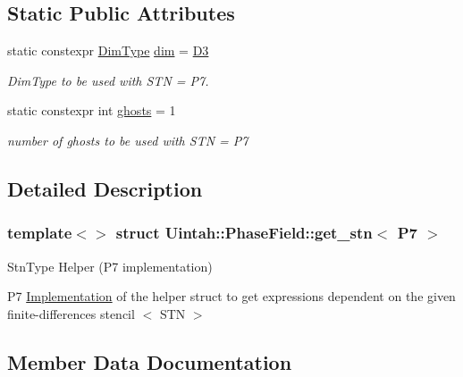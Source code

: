 \subsection*{Static Public Attributes}
\begin{DoxyCompactItemize}
\item 
static constexpr \hyperlink{namespaceUintah_1_1PhaseField_a12bfc68444894dffdf0cb8d9cf0cc76a}{Dim\+Type} \hyperlink{structUintah_1_1PhaseField_1_1get__stn_3_01P7_01_4_a6f9b1f56f0bd4c6b48980667c7e2bf29}{dim} = \hyperlink{namespaceUintah_1_1PhaseField_a12bfc68444894dffdf0cb8d9cf0cc76aa72fd61934c7ca788c49ad90629f76e78}{D3}
\begin{DoxyCompactList}\small\item\em Dim\+Type to be used with S\+TN = P7. \end{DoxyCompactList}\item 
static constexpr int \hyperlink{structUintah_1_1PhaseField_1_1get__stn_3_01P7_01_4_af08edc97f6f80ca3946b9ebba54a943e}{ghosts} = 1
\begin{DoxyCompactList}\small\item\em number of ghosts to be used with S\+TN = P7 \end{DoxyCompactList}\end{DoxyCompactItemize}


\subsection{Detailed Description}
\subsubsection*{template$<$$>$\newline
struct Uintah\+::\+Phase\+Field\+::get\+\_\+stn$<$ P7 $>$}

Stn\+Type Helper (P7 implementation) 

P7 \hyperlink{classUintah_1_1PhaseField_1_1Implementation}{Implementation} of the helper struct to get expressions dependent on the given finite-\/differences stencil $<$ S\+TN $>$ 

\subsection{Member Data Documentation}
\mbox{\label{structUintah_1_1PhaseField_1_1get__stn_3_01P7_01_4_a6f9b1f56f0bd4c6b48980667c7e2bf29}} 
